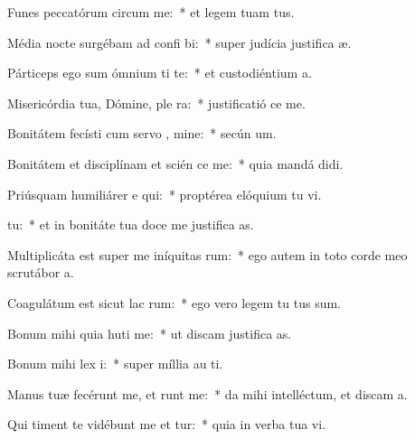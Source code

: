 \item Funes peccatórum circum  me:~* et legem tuam   tus.
\item Média nocte surgébam ad confi bi:~* super judícia justifica æ.
\item Párticeps ego sum ómnium ti te:~* et custodiéntium  a.
\item Misericórdia tua, Dómine, ple  ra:~* justificatió  ce me.
\item Bonitátem fecísti cum servo , mine:~* secún  um.
\item Bonitátem et disciplínam et scién ce me:~* quia mandá  didi.
\item Priúsquam humiliárer e qui:~* proptérea elóquium tu vi.
\item {}  tu:~* et in bonitáte tua doce me justifica as.
\item Multiplicáta est super me iníquitas rum:~* ego autem in toto corde meo scrutábor  a.
\item Coagulátum est sicut lac  rum:~* ego vero legem tu tus sum.
\item Bonum mihi quia huti me:~* ut discam justifica as.
\item Bonum mihi lex  i:~* super míllia au  ti.
\item Manus tuæ fecérunt me, et runt me:~* da mihi intelléctum, et discam  a.
\item Qui timent te vidébunt me et tur:~* quia in verba tua vi.

